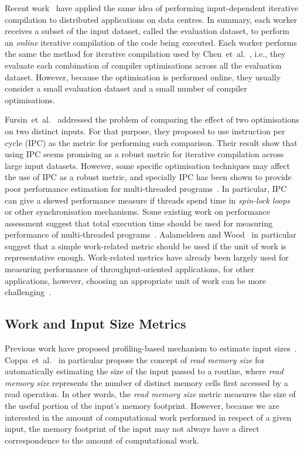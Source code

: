 \documentclass[sigplan,10pt]{acmart}
\theoremstyle{definition}
\newcommand{\etal}{et~al.}
\newcommand{\itercomp}{{iterative compilation}}
\begin{document}
Recent work~\cite{chen12b,fang15} have applied the same idea of performing input-dependent {\itercomp} to distributed applications on data centres.
In summary, each worker receives a subset of the input dataset, called the evaluation dataset, to perform an \textit{online} {\itercomp} of the code being executed.
Each worker performs the same the method for {\itercomp} used by Chen~\etal~\cite{chen10,chen12a}, i.e., they evaluate each combination of compiler optimisations across all the evaluation dataset.
However, because the optimisation is performed online, they usually consider a small evaluation dataset and a small number of compiler optimisations.

Fursin~\etal~\cite{fursin07} addressed the problem of comparing the effect of two optimisations on two distinct inputs. For that purpose, they proposed to use instruction per cycle (IPC) as the metric for performing such comparison.
Their result show that using IPC seems promising as a robust metric for {\itercomp} across large input datasets.
However, some specific optimisation techniques may affect the use of IPC as a robust metric, and specially IPC has been shown to provide poor performance estimation for multi-threaded programs~\cite{alameldeen06,eyerman08}.
In particular, IPC can give a skewed performance measure if threads spend time in \textit{spin-lock loops} or other synchronisation mechanisms.
Some existing work on performance assessment suggest that total execution time should be used for measuring performance of multi-threaded programs~\cite{alameldeen06,eyerman08}.
Aalameldeen and Wood~\cite{alameldeen06} in particular suggest that a simple work-related metric should be used if the unit of work is representative enough.
Work-related metrics have already been largely used for measuring performance of throughput-oriented applications, for other applications, however, choosing an appropriate unit of work can be more challenging~\cite{alameldeen06}.

\subsection{Work and Input Size Metrics}

Previous work have proposed profiling-based mechanism to estimate input sizes~\cite{zaparanuks12,coppa14}.
Coppa~\etal~\cite{coppa14} in particular propose the concept of \textit{read memory size} for automatically estimating the size of the input passed to a routine, where \textit{read memory size} represents the number of distinct memory cells first accessed by a read operation.
In other words, the \textit{read memory size} metric measures the size of the useful portion of the input's memory footprint.
However, because we are interested in the amount of computational work performed in respect of a given input, the memory footprint of the input may not always have a direct correspondence to  the amount of computational work.
\end{document}
